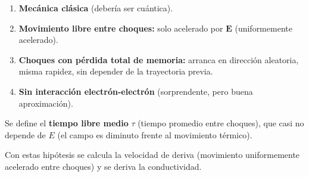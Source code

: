 \documentclass[12pt,a4paper]{article}
\begin{document}
\begin{enumerate}[nosep]
  \item \textbf{Mecánica clásica} (debería ser cuántica).
  \item \textbf{Movimiento libre entre choques:} solo acelerado por
        $\mathbf{E}$ (uniformemente acelerado).
  \item \textbf{Choques con pérdida total de memoria:} arranca en
        dirección aleatoria, misma rapidez, sin depender de la
        trayectoria previa.
  \item \textbf{Sin interacción electrón-electrón} (sorprendente, pero
        buena aproximación).
\end{enumerate}

Se define el \textbf{tiempo libre medio} $\tau$ (tiempo promedio entre
choques), que casi no depende de $E$ (el campo es diminuto frente al
movimiento térmico).

\begin{notebox}
  Con estas hipótesis se calcula la velocidad de deriva (movimiento
  uniformemente acelerado entre choques) y se deriva la conductividad.
\end{notebox}
\end{document}

